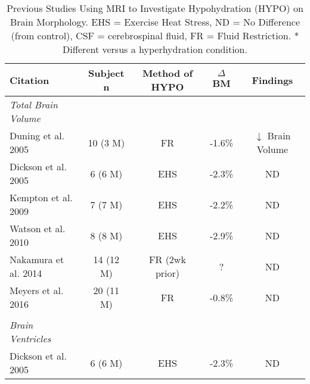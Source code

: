 \begin{table}
	\caption{Previous Studies Using MRI to Investigate Hypohydration (HYPO) on Brain Morphology. EHS = Exercise Heat Stress, ND = No Difference (from control), CSF = cerebrospinal fluid, FR = Fluid Restriction. * Different versus a hyperhydration condition.}
	\begin{center}
		
		\begin{tabular}{lcccc} 
			\hline
			\footnotesize\textbf{Citation} & \footnotesize\textbf{Subject n} & \footnotesize\textbf{Method of HYPO} & \textbf{${\Delta}$ BM} & \footnotesize\textbf{Findings} \\
			\hline
			
			\footnotesize\textit{Total Brain Volume} &&&& \\
			\footnotesize Duning et al. 2005 \cite{duning_dehydration_2005} & \footnotesize 10 \scriptsize(3 M) & \footnotesize FR & \footnotesize -1.6\% & \footnotesize ${\downarrow}$ Brain Volume \\
			
			\footnotesize Dickson et al. 2005 \cite{dickson_effects_2005} & \footnotesize 6 \scriptsize(6 M) & \footnotesize EHS & \footnotesize -2.3\% & \footnotesize ND \\
			
			\footnotesize Kempton et al. 2009 \cite{kempton_effects_2009} & \footnotesize 7 \scriptsize(7 M) & \footnotesize EHS & \footnotesize -2.2\% & \footnotesize ND \\
			
			\footnotesize Watson et al. 2010 \cite{watson_effect_2010} & \footnotesize 8 \scriptsize(8 M) & \footnotesize EHS & \footnotesize -2.9\% & \footnotesize ND \\
			
			\footnotesize Nakamura et al. 2014 \cite{nakamura_correlation_2014} & \footnotesize 14 \scriptsize(12 M) & \footnotesize FR \scriptsize(2wk prior) & \footnotesize ? & \footnotesize ND \\
			
			\footnotesize Meyers et al. 2016 \cite{meyers_does_2016} & \footnotesize 20 \scriptsize(11 M) & \footnotesize FR & \footnotesize -0.8\% & \footnotesize ND \\
			
			&&&& \\
			\footnotesize\textit{Brain Ventricles} &&&& \\
			\footnotesize Dickson et al. 2005 \cite{dickson_effects_2005} & \footnotesize 6 \scriptsize(6 M) & \footnotesize EHS & \footnotesize -2.3\% & \footnotesize ND \\
			

\end{tabular}
\end{center}
\end{table}
